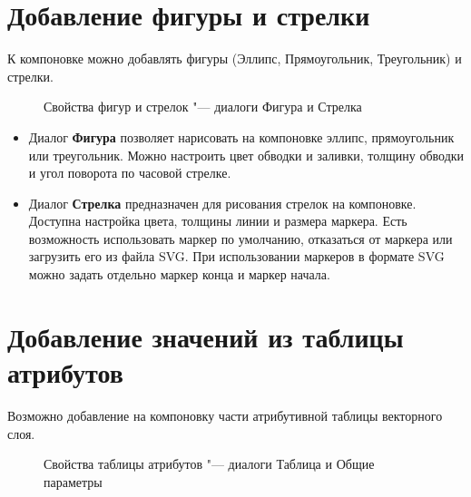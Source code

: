 \section{Добавление фигуры и стрелки}

К компоновке можно добавлять фигуры (Эллипс, Прямоугольник, Треугольник)
и стрелки.

\begin{figure}[ht]
\centering
{}
\hspace{1cm}
\caption{Свойства фигур и стрелок "--- диалоги Фигура и Стрелка \nixcaption}\label{fig:shapearrow}
\end{figure}

\begin{itemize}[label=--]
\item Диалог \textbf{Фигура} позволяет нарисовать на компоновке эллипс,
прямоугольник или треугольник. Можно настроить цвет обводки и заливки,
толщину обводки и угол поворота по часовой стрелке.
\item Диалог \textbf{Стрелка} предназначен для рисования стрелок на
компоновке. Доступна настройка цвета, толщины линии и размера маркера.
Есть возможность использовать маркер по умолчанию, отказаться от маркера
или загрузить его из файла SVG. При использовании маркеров в формате SVG
можно задать отдельно маркер конца и маркер начала.
\end{itemize}

\section{Добавление значений из таблицы атрибутов}

Возможно добавление на компоновку части атрибутивной таблицы векторного
слоя.

\begin{figure}[ht]
\centering
{}
\hspace{1cm}
\caption{Свойства таблицы атрибутов "--- диалоги Таблица и Общие параметры \nixcaption}\label{fig:attrcomp}
\end{figure}

